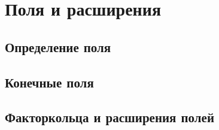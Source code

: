 \section{Поля и расширения}
\subsection{Определение поля}
\subsection{Конечные поля}
\subsection{Факторкольца и расширения полей}


